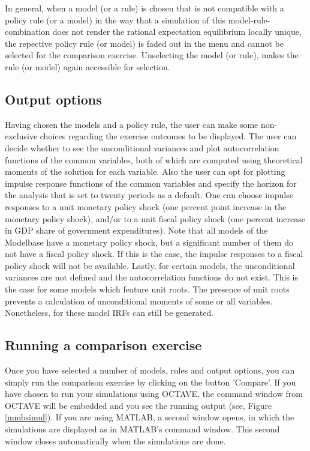 In general, when a model (or a rule) is chosen that is not compatible with a policy rule (or a model) in the way that a simulation of this model-rule-combination does not render the rational expectation equilibrium locally unique, the repective policy rule (or model) is faded out in the menu and cannot be selected for the comparison exercise. Unselecting the model (or rule), makes the rule (or model) again accessible for selection. 

\subsection*{Output options}

Having chosen the models and a policy rule, the user can make some non-exclusive choices regarding the exercise outcomes to be displayed. The user can decide whether to see the unconditional variances and plot autocorrelation functions of the common variables, both of which are computed using theoretical moments of the solution for each variable. Also the user can opt for plotting impulse response functions of the common variables and specify the horizon for the analysis that is set to twenty periods as a default. One can choose impulse responses to a unit monetary policy shock (one percent point increase in the monetary policy shock), and/or to a unit fiscal policy shock (one percent increase in GDP share of government expenditures). Note that all models of the Modelbase have a monetary policy shock, but a significant number of them do not have a fiscal policy shock. If this is the case, the impulse responses to a fiscal policy shock will not be available. Lastly, for certain models, the unconditional variances are not defined and the autocorrelation functions do not exist. This is the case for some models which feature unit roots. The presence of unit roots prevents a calculation of unconditional moments of some or all variables. Nonetheless, for these model IRFs can still be generated. 

\subsection*{Running a comparison exercise}
Once you have selected a number of models, rules and output options, you can simply run the comparison exercise by clicking on the button 'Compare'. If you have chosen to run your simulations using OCTAVE, the command window from OCTAVE will be embedded and you see the running output (see, Figure \ref{mmbsimul}). If you are using MATLAB, a second window opens, in which the simulations are displayed as in MATLAB's command window. This second window closes automatically when the simulations are done.
 
